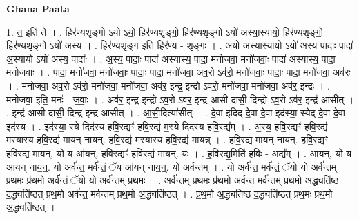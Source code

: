 \documentclass[17pt]{extarticle}
\begin{document}
\textbf{Ghana Paata } \newline

1. त॒ इति॑ ते । . हिर॑ण्यशृ॒ङ्गो ऽयो ऽयो॒ हिर॑ण्यशृङ्गो॒ हिर॑ण्यशृ॒ङ्गो ऽयो॑ अस्या॒स्यायो॒ हिर॑ण्यशृङ्गो॒ हिर॑ण्यशृ॒ङ्गो ऽयो॑ अस्य । . हिर॑ण्यशृङ्ग॒ इति॒ हिर॑ण्य - शृ॒ङ्गः॒ । . अयो॑ अस्या॒स्यायो ऽयो॑ अस्य॒ पादाः॒ पादा॑ अ॒स्यायो ऽयो॑ अस्य॒ पादाः᳚ । . अ॒स्य॒ पादाः॒ पादा॑ अस्यास्य॒ पादा॒ मनो॑जवा॒ मनो॑जवाः॒ पादा॑ अस्यास्य॒ पादा॒ मनो॑जवाः । . पादा॒ मनो॑जवा॒ मनो॑जवाः॒ पादाः॒ पादा॒ मनो॑जवा॒ अव॒रो ऽव॑रो॒ मनो॑जवाः॒ पादाः॒ पादा॒ मनो॑जवा॒ अव॑रः । . मनो॑जवा॒ अव॒रो ऽव॑रो॒ मनो॑जवा॒ मनो॑जवा॒ अव॑र॒ इन्द्र॒ इन्द्रो ऽव॑रो॒ मनो॑जवा॒ मनो॑जवा॒ अव॑र॒ इन्द्रः॑ । . मनो॑जवा॒ इति॒ मनः॑ - ज॒वाः॒ । . अव॑र॒ इन्द्र॒ इन्द्रो ऽव॒रो ऽव॑र॒ इन्द्र॑ आसी दासी॒ दिन्द्रो ऽव॒रो ऽव॑र॒ इन्द्र॑ आसीत् । . इन्द्र॑ आसी दासी॒ दिन्द्र॒ इन्द्र॑ आसीत् । . आ॒सी॒दित्या॑सीत् । . दे॒वा इदिद् दे॒वा दे॒वा इद॑स्या॒ स्येद् दे॒वा दे॒वा इद॑स्य । . इद॑स्या॒ स्ये दिद॑स्य हवि॒रद्यꣳ॑ हवि॒रद्य॑ म॒स्ये दिद॑स्य हवि॒रद्य᳚म् । . अ॒स्य॒ ह॒वि॒रद्यꣳ॑ हवि॒रद्य॑ मस्यास्य हवि॒रद्य॑ मायन् नायन्. हवि॒रद्य॑ मस्यास्य हवि॒रद्य॑ मायन्न् । . ह॒वि॒रद्य॑ मायन् नायन्. हवि॒रद्यꣳ॑ हवि॒रद्य॑ माय॒न्॒. यो य आ॑यन्. हवि॒रद्यꣳ॑ हवि॒रद्य॑ माय॒न्॒. यः । . ह॒वि॒रद्य॒मिति॑ हविः - अद्य᳚म् । . आ॒य॒न्॒. यो य आ॑यन् नाय॒न्॒. यो अर्व॑न्त॒ मर्व॑न्तं॒ ॅय आ॑यन् नाय॒न्॒. यो अर्व॑न्तम् । . यो अर्व॑न्त॒ मर्व॑न्तं॒ ॅयो यो अर्व॑न्तम् प्रथ॒मः प्र॑थ॒मो अर्व॑न्तं॒ ॅयो यो अर्व॑न्तम् प्रथ॒मः । . अर्व॑न्तम् प्रथ॒मः प्र॑थ॒मो अर्व॑न्त॒ मर्व॑न्तम् प्रथ॒मो अ॒द्ध्यति॑ष्ठ द॒द्ध्यति॑ष्ठत् प्रथ॒मो 
अर्व॑न्त॒ मर्व॑न्तम् प्रथ॒मो अ॒द्ध्यति॑ष्ठत् । . प्र॒थ॒मो अ॒द्ध्यति॑ष्ठ द॒द्ध्यति॑ष्ठत् प्रथ॒मः प्र॑थ॒मो अ॒द्ध्यति॑ष्ठत् । \newline
\end{document}
